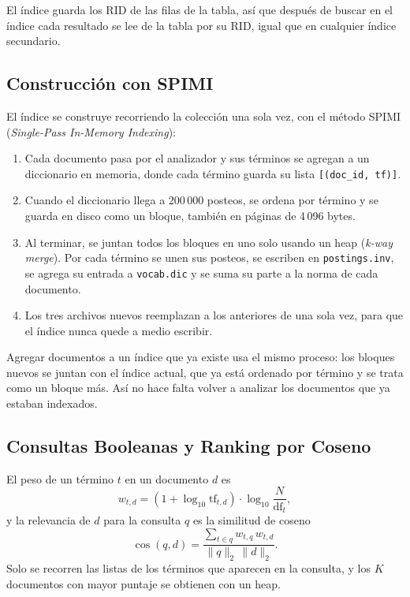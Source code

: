 \documentclass[a4paper,12pt]{article}
\begin{document}
El índice guarda los RID de las filas de la tabla, así que después de buscar en
el índice cada resultado se lee de la tabla por su RID, igual que en cualquier
índice secundario.

\subsection{Construcción con SPIMI}

El índice se construye recorriendo la colección una sola vez, con el método
SPIMI (\textit{Single-Pass In-Memory Indexing}):

\begin{enumerate}
    \item Cada documento pasa por el analizador y sus términos se agregan a un
    diccionario en memoria, donde cada término guarda su lista
    \texttt{[(doc\_id, tf)]}.
    \item Cuando el diccionario llega a 200\,000 posteos, se ordena por término y
    se guarda en disco como un bloque, también en páginas de 4\,096 bytes.
    \item Al terminar, se juntan todos los bloques en uno solo usando un heap
    (\textit{k-way merge}). Por cada término se unen sus posteos, se escriben en
    \texttt{postings.inv}, se agrega su entrada a \texttt{vocab.dic} y se suma su
    parte a la norma de cada documento.
    \item Los tres archivos nuevos reemplazan a los anteriores de una sola vez,
    para que el índice nunca quede a medio escribir.
\end{enumerate}

Agregar documentos a un índice que ya existe usa el mismo proceso: los bloques
nuevos se juntan con el índice actual, que ya está ordenado por término y se
trata como un bloque más. Así no hace falta volver a analizar los documentos que
ya estaban indexados.

\subsection{Consultas Booleanas y Ranking por Coseno}

El peso de un término $t$ en un documento $d$ es
\begin{equation}
    w_{t,d} = \left(1 + \log_{10} \text{tf}_{t,d}\right) \cdot \log_{10} \frac{N}{\text{df}_t},
\end{equation}
y la relevancia de $d$ para la consulta $q$ es la similitud de coseno
\begin{equation}
    \cos(q, d) = \frac{\sum_{t \in q} w_{t,q}\, w_{t,d}}{\lVert q \rVert_2 \, \lVert d \rVert_2}.
\end{equation}
Solo se recorren las listas de los términos que aparecen en la consulta, y los
$K$ documentos con mayor puntaje se obtienen con un heap.
\end{document}
